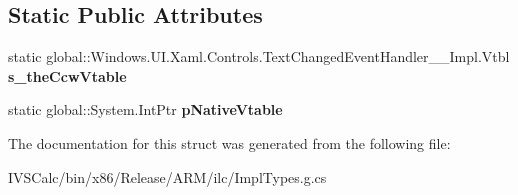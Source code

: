 \subsection*{Static Public Attributes}
\begin{DoxyCompactItemize}
\item 
\mbox{\label{struct_windows_1_1_u_i_1_1_xaml_1_1_controls_1_1_text_changed_event_handler_____impl_1_1_vtbl_a5f6f72fc42952474c78adcf43fae0fcb}} 
static global\+::\+Windows.\+U\+I.\+Xaml.\+Controls.\+Text\+Changed\+Event\+Handler\+\_\+\+\_\+\+Impl.\+Vtbl {\bfseries s\+\_\+the\+Ccw\+Vtable}
\item 
\mbox{\label{struct_windows_1_1_u_i_1_1_xaml_1_1_controls_1_1_text_changed_event_handler_____impl_1_1_vtbl_abe043eedaae9c1f37397b0f59b97a9a8}} 
static global\+::\+System.\+Int\+Ptr {\bfseries p\+Native\+Vtable}
\end{DoxyCompactItemize}


The documentation for this struct was generated from the following file\+:\begin{DoxyCompactItemize}
\item 
I\+V\+S\+Calc/bin/x86/\+Release/\+A\+R\+M/ilc/Impl\+Types.\+g.\+cs\end{DoxyCompactItemize}
